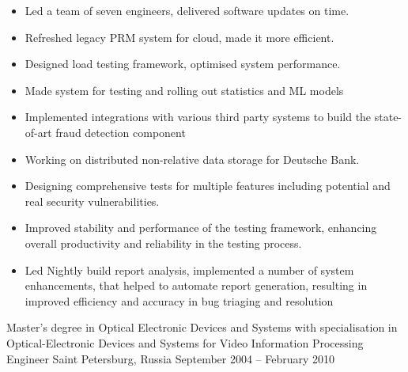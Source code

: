 \documentclass[a4paper,10pt]{article}
\begin{document}
    \begin{itemize}
        \item Led a team of seven engineers, delivered software updates on time.
        \item Refreshed legacy PRM system for cloud, made it more efficient.
        \item Designed load testing framework, optimised system performance.
    \end{itemize}

    \begin{itemize}
        \item Made system for testing and rolling out statistics and ML models
        \item Implemented integrations with various third party systems to build the state-of-art fraud detection component
    \end{itemize}

    \begin{itemize}
        \item Working on distributed non-relative data storage for Deutsche Bank.
    \end{itemize}

    \begin{itemize}
        \item Designing comprehensive tests for multiple features including potential and real security vulnerabilities.
        \item Improved stability and performance of the testing framework, enhancing overall productivity and reliability
        in the testing process.
        \item Led Nightly build report analysis, implemented a number of system enhancements, that helped to automate report
        generation, resulting in improved efficiency and accuracy in bug triaging and resolution
    \end{itemize}



    {Master’s degree in Optical Electronic Devices and Systems with specialisation in Optical-Electronic Devices and Systems for Video Information Processing}
    {Engineer}
    {Saint Petersburg, Russia}
    {September 2004 -- February 2010}
\end{document}
